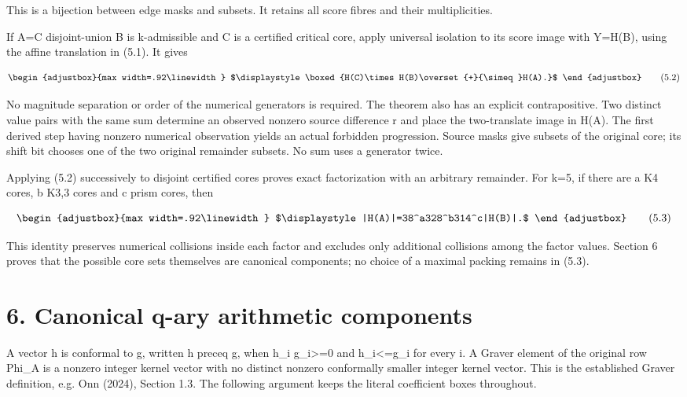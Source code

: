 This is a bijection between edge masks and subsets. It retains all score fibres and their multiplicities.

If A=C disjoint-union B is k-admissible and C is a certified critical core, apply universal isolation to its score image with Y=H(B), using the affine translation in (5.1). It gives

\[
\begin{adjustbox}{max width=.92\linewidth}
$\displaystyle \boxed{H(C)\times H(B)\overset{+}{\simeq}H(A).}$
\end{adjustbox}
\tag{5.2}
\]

No magnitude separation or order of the numerical generators is required. The theorem also has an explicit contrapositive. Two distinct value pairs with the same sum determine an observed nonzero source difference r and place the two-translate image in H(A). The first derived step having nonzero numerical observation yields an actual forbidden progression. Source masks give subsets of the original core; its shift bit chooses one of the two original remainder subsets. No sum uses a generator twice.

Applying (5.2) successively to disjoint certified cores proves exact factorization with an arbitrary remainder. For k=5, if there are a K4 cores, b K3,3 cores and c prism cores, then

\[
\begin{adjustbox}{max width=.92\linewidth}
$\displaystyle |H(A)|=38^a328^b314^c|H(B)|.$
\end{adjustbox}
\tag{5.3}
\]

This identity preserves numerical collisions inside each factor and excludes only additional collisions among the factor values. Section 6 proves that the possible core sets themselves are canonical components; no choice of a maximal packing remains in (5.3).

\section{6. Canonical q-ary arithmetic components}\label{n18-canonical-q-ary-arithmetic-components}

A vector h is conformal to g, written h preceq g, when h\_i g\_i\textgreater=0 and \textbar h\_i\textbar\textless=\textbar g\_i\textbar{} for every i. A Graver element of the original row Phi\_A is a nonzero integer kernel vector with no distinct nonzero conformally smaller integer kernel vector. This is the established Graver definition, e.g. Onn (2024), Section 1.3. The following argument keeps the literal coefficient boxes throughout.

